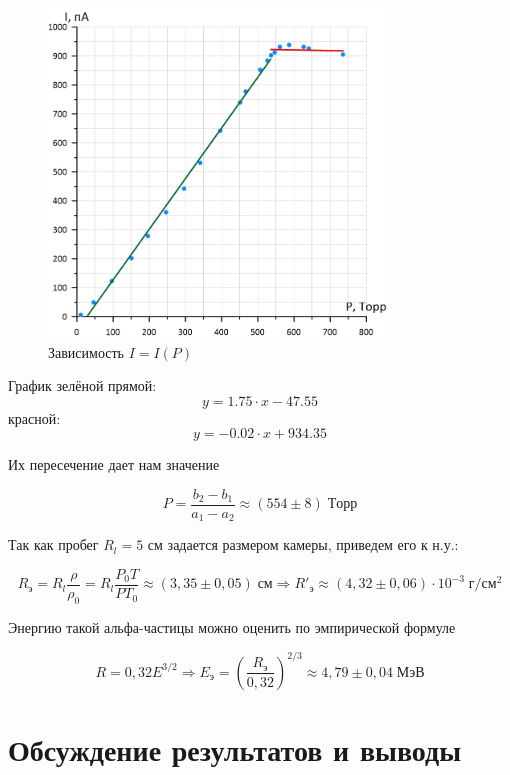 \documentclass[a4paper, 12pt]{article}
\begin{document}
\begin{figure}[h]
\begin{center}
\includegraphics[width = 0.8\textwidth]{plotIon.jpg}
\caption{Зависимость $I = I(P)$}
\label{plot:Ion}
\end{center}
\end{figure}

График зелёной прямой:
$$ y = 1.75 \cdot x - 47.55$$
красной:
$$ y = -0.02 \cdot x + 934.35$$

Их пересечение дает нам значение 
	
	\begin{equation}\label{}
	P = \dfrac{b_2 - b_1}{a_1 - a_2} \approx (554 \pm 8) \; Торр 
	\end{equation}
	
	Так как пробег $ R_l = 5 $ см задается размером камеры, приведем его к н.у.:
	
	\begin{equation}\label{}
	R_э = R_l \dfrac{\rho}{\rho_0} = R_l \dfrac{P_0T}{PT_0} \approx (3,35 \pm 0,05) \; см \Rightarrow R'_э \approx (4,32 \pm 0,06)\cdot 10^{-3} \; г/см^2
	\end{equation}
	
	Энергию такой альфа-частицы можно оценить по эмпирической формуле 
	
	\begin{equation}\label{}
	R = 0,32 E^{3/2} \Rightarrow E_э = \left(  \dfrac{R_э}{0,32} \right)^{2/3} \approx 4,79 \pm 0,04 \; МэВ
	\end{equation}	

\section{Обсуждение результатов и выводы}
\end{document}
